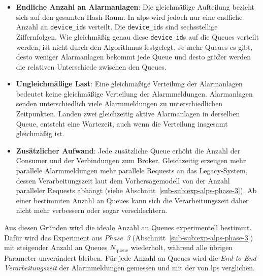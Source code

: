\begin{itemize}
    \item \textbf{Endliche Anzahl an Alarmanlagen}: Die gleichmäßige Aufteilung bezieht sich auf den gesamten Hash-Raum. In \gls{alps} wird jedoch nur eine endliche Anzahl an \texttt{device\_id}s verteilt. Die \texttt{device\_id}s sind sechsstellige Ziffernfolgen. Wie gleichmäßig genau diese \texttt{device\_id}s auf die Queues verteilt werden, ist nicht durch den Algorithmus festgelegt. Je mehr Queues es gibt, desto weniger Alarmanlagen bekommt jede Queue und desto größer werden die relativen Unterschiede zwischen den Queues.

    \item \textbf{Ungleichmäßige Last}: Eine gleichmäßige Verteilung der Alarmanlagen bedeutet keine gleichmäßige Verteilung der Alarmmeldungen. Alarmanlagen senden unterschiedlich viele Alarmmeldungen zu unterschiedlichen Zeitpunkten. Landen zwei gleichzeitig aktive Alarmanlagen in derselben Queue, entsteht eine Wartezeit, auch wenn die Verteilung insgesamt gleichmäßig ist.

    \item \textbf{Zusätzlicher Aufwand}: Jede zusätzliche Queue erhöht die Anzahl der Consumer und der Verbindungen zum Broker. Gleichzeitig erzeugen mehr parallele Alarmmeldungen mehr parallele Requests an das Legacy-System, dessen Verarbeitungszeit laut dem Vorhersagemodell von der Anzahl paralleler Requests abhängt (siehe Abschnitt~\ref{sub-sub:exp-alps-phase-3}). Ab einer bestimmten Anzahl an Queues kann sich die Verarbeitungszeit daher nicht mehr verbessern oder sogar verschlechtern.
\end{itemize}

Aus diesen Gründen wird die ideale Anzahl an Queues experimentell bestimmt. Dafür wird das Experiment aus \textit{Phase~3} (Abschnitt~\ref{sub-sub:exp-alps-phase-3}) mit steigender Anzahl an Queues $N_{\text{queue}}$ wiederholt, während alle übrigen Parameter unverändert bleiben. Für jede Anzahl an Queues wird die \textit{End-to-End-Verarbeitungszeit} der Alarmmeldungen gemessen und mit der von \gls{lps} verglichen.
